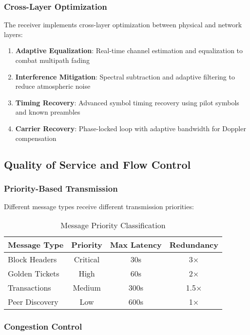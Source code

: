 \documentclass[11pt,a4paper]{article}
\begin{document}
\subsubsection{Cross-Layer Optimization}

The receiver implements cross-layer optimization between physical and network layers:

\begin{enumerate}
\item \textbf{Adaptive Equalization}: Real-time channel estimation and equalization to combat multipath fading
\item \textbf{Interference Mitigation}: Spectral subtraction and adaptive filtering to reduce atmospheric noise
\item \textbf{Timing Recovery}: Advanced symbol timing recovery using pilot symbols and known preambles
\item \textbf{Carrier Recovery}: Phase-locked loop with adaptive bandwidth for Doppler compensation
\end{enumerate}

\subsection{Quality of Service and Flow Control}

\subsubsection{Priority-Based Transmission}

Different message types receive different transmission priorities:

\begin{table}[h]
\centering
\begin{tabular}{lccc}
\toprule
Message Type & Priority & Max Latency & Redundancy \\
\midrule
Block Headers & Critical & 30s & 3× \\
Golden Tickets & High & 60s & 2× \\
Transactions & Medium & 300s & 1.5× \\
Peer Discovery & Low & 600s & 1× \\
\bottomrule
\end{tabular}
\caption{Message Priority Classification}
\end{table}

\subsubsection{Congestion Control}
\end{document}
